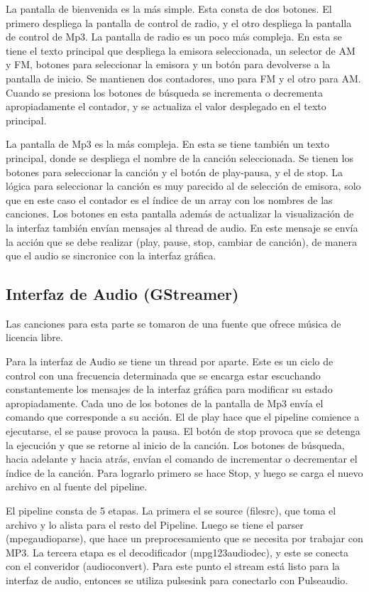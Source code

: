 La pantalla de bienvenida es la más simple. Esta consta de dos botones. El primero despliega la
pantalla de control de radio, y el otro despliega la pantalla de control de Mp3. La pantalla de
radio es un poco más compleja. En esta se tiene el texto principal que despliega la emisora
seleccionada, un selector de AM y FM, botones para seleccionar la emisora y un botón para devolverse
a la pantalla de inicio. Se mantienen dos contadores, uno para FM y el otro para AM. Cuando se
presiona los botones de búsqueda se incrementa o decrementa apropiadamente el contador, y se
actualiza el valor desplegado en el texto principal.

La pantalla de Mp3 es la más compleja. En esta se tiene también un texto principal, donde se
despliega el nombre de la canción seleccionada. Se tienen los botones para seleccionar la canción y
el botón de play-pausa, y el de stop. La lógica para seleccionar la canción es muy parecido al de
selección de emisora, solo que en este caso el contador es el índice de un array con los nombres de
las canciones. Los botones en esta pantalla además de actualizar la visualización de la interfaz
también envían mensajes al thread de audio. En este mensaje se envía la acción que se debe realizar
(play, pause, stop, cambiar de canción), de manera que el audio se sincronice con la interfaz
gráfica. 

\subsection{Interfaz de Audio (GStreamer)}
\label{sec:gstramer}
Las canciones para esta parte se tomaron de una fuente que ofrece música de licencia libre.

Para la interfaz de Audio se tiene un thread por aparte. Este es un ciclo de control con una
frecuencia determinada que se encarga estar escuchando constantemente los mensajes de la interfaz
gráfica para modificar su estado apropiadamente. Cada uno de los botones de la pantalla de Mp3 envía
el comando que corresponde a su acción. El de play hace que el pipeline comience a ejecutarse, el se
pause provoca la pausa. El botón de stop provoca que se detenga la ejecución y que se retorne al
inicio de la canción. Los botones de búsqueda, hacia adelante y hacia atrás, envían el comando de
incrementar o decrementar el índice de la canción. Para lograrlo primero se hace Stop, y luego se
carga el nuevo archivo en al fuente del pipeline. 

El pipeline consta de 5 etapas. La primera el se source (filesrc), que toma el archivo y lo alista
para el resto del Pipeline. Luego se tiene el parser (mpegaudioparse), que hace un preprocesamiento
que se necesita por trabajar con MP3. La tercera etapa es el decodificador (mpg123audiodec), y este
se conecta con el converidor (audioconvert). Para este punto el stream está listo para la interfaz
de audio, entonces se utiliza pulsesink para conectarlo con Pulseaudio. 


